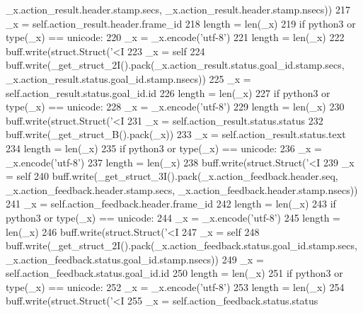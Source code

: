 \begin{DoxyCode}
{{{      \_x.action\_result.header.stamp.secs, \_x.action\_result.header.stamp.nsecs))
217       \_x = self.action\_result.header.frame\_id
218       length = len(\_x)
219       \textcolor{keywordflow}{if} python3 \textcolor{keywordflow}{or} type(\_x) == unicode:
220         \_x = \_x.encode(\textcolor{stringliteral}{'utf-8'})
221         length = len(\_x)
222       buff.write(struct.Struct(\textcolor{stringliteral}{'<I%
223       \_x = self
224       buff.write(\_get\_struct\_2I().pack(\_x.action\_result.status.goal\_id.stamp.secs, 
      \_x.action\_result.status.goal\_id.stamp.nsecs))
225       \_x = self.action\_result.status.goal\_id.id
226       length = len(\_x)
227       \textcolor{keywordflow}{if} python3 \textcolor{keywordflow}{or} type(\_x) == unicode:
228         \_x = \_x.encode(\textcolor{stringliteral}{'utf-8'})
229         length = len(\_x)
230       buff.write(struct.Struct(\textcolor{stringliteral}{'<I%
231       \_x = self.action\_result.status.status
232       buff.write(\_get\_struct\_B().pack(\_x))
233       \_x = self.action\_result.status.text
234       length = len(\_x)
235       \textcolor{keywordflow}{if} python3 \textcolor{keywordflow}{or} type(\_x) == unicode:
236         \_x = \_x.encode(\textcolor{stringliteral}{'utf-8'})
237         length = len(\_x)
238       buff.write(struct.Struct(\textcolor{stringliteral}{'<I%
239       \_x = self
240       buff.write(\_get\_struct\_3I().pack(\_x.action\_feedback.header.seq, \_x.action\_feedback.header.stamp.secs,
       \_x.action\_feedback.header.stamp.nsecs))
241       \_x = self.action\_feedback.header.frame\_id
242       length = len(\_x)
243       \textcolor{keywordflow}{if} python3 \textcolor{keywordflow}{or} type(\_x) == unicode:
244         \_x = \_x.encode(\textcolor{stringliteral}{'utf-8'})
245         length = len(\_x)
246       buff.write(struct.Struct(\textcolor{stringliteral}{'<I%
247       \_x = self
248       buff.write(\_get\_struct\_2I().pack(\_x.action\_feedback.status.goal\_id.stamp.secs, 
      \_x.action\_feedback.status.goal\_id.stamp.nsecs))
249       \_x = self.action\_feedback.status.goal\_id.id
250       length = len(\_x)
251       \textcolor{keywordflow}{if} python3 \textcolor{keywordflow}{or} type(\_x) == unicode:
252         \_x = \_x.encode(\textcolor{stringliteral}{'utf-8'})
253         length = len(\_x)
254       buff.write(struct.Struct(\textcolor{stringliteral}{'<I%
255       \_x = self.action\_feedback.status.status
}}}}}}}}
\end{DoxyCode}
